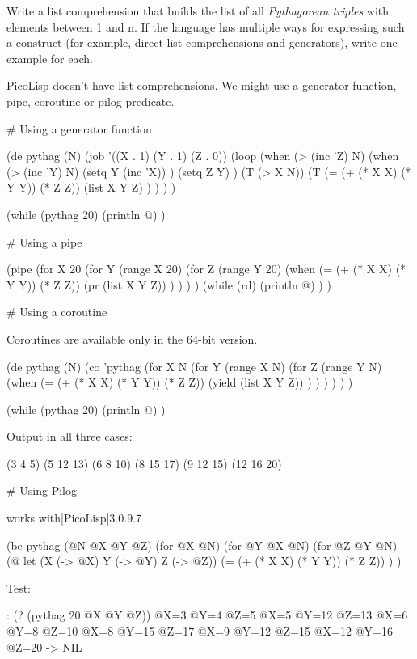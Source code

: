 \begin{itemize}
Write a list comprehension that builds the list of all
\emph{Pythagorean triples} with elements between 1 and n. If the
language has multiple ways for expressing such a construct (for
example, direct list comprehensions and generators), write one example
for each.

\begin{wideverbatim}

PicoLisp doesn't have list comprehensions.
We might use a generator function, pipe, coroutine or pilog predicate.

# Using a generator function

(de pythag (N)
   (job '((X . 1) (Y . 1) (Z . 0))
      (loop
         (when (> (inc 'Z) N)
            (when (> (inc 'Y) N)
               (setq Y (inc 'X)) )
            (setq Z Y) )
         (T (> X N))
         (T (= (+ (* X X) (* Y Y)) (* Z Z))
            (list X Y Z) ) ) ) )

(while (pythag 20)
   (println @) )

# Using a pipe

(pipe
   (for X 20
      (for Y (range X 20)
         (for Z (range Y 20)
            (when (= (+ (* X X) (* Y Y)) (* Z Z))
               (pr (list X Y Z)) ) ) ) )
   (while (rd)
      (println @) ) )

# Using a coroutine

Coroutines are available only in the 64-bit version.

(de pythag (N)
   (co 'pythag
      (for X N
         (for Y (range X N)
            (for Z (range Y N)
               (when (= (+ (* X X) (* Y Y)) (* Z Z))
                  (yield (list X Y Z)) ) ) ) ) ) )

(while (pythag 20)
   (println @) )

\end{wideverbatim}

\begin{wideverbatim}

Output in all three cases:

(3 4 5)
(5 12 13)
(6 8 10)
(8 15 17)
(9 12 15)
(12 16 20)

# Using Pilog

{{works with|PicoLisp|3.0.9.7}}

(be pythag (@N @X @Y @Z)
   (for @X @N)
   (for @Y @X @N)
   (for @Z @Y @N)
   (@ let (X (-> @X)  Y (-> @Y)  Z (-> @Z))
       (= (+ (* X X) (* Y Y)) (* Z Z)) ) )


Test:

: (? (pythag 20 @X @Y @Z))
 @X=3 @Y=4 @Z=5
 @X=5 @Y=12 @Z=13
 @X=6 @Y=8 @Z=10
 @X=8 @Y=15 @Z=17
 @X=9 @Y=12 @Z=15
 @X=12 @Y=16 @Z=20
-> NIL


\end{wideverbatim}
\end{itemize}

